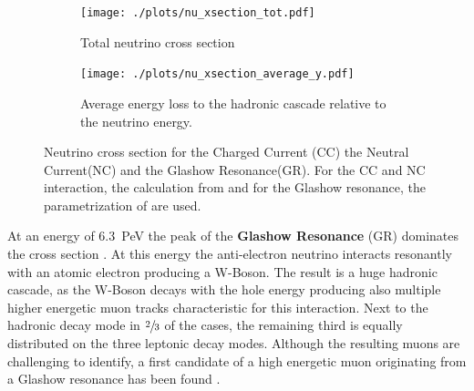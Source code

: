 \begin{figure}
    \centering
    \begin{subfigure}[t]{0.47\textwidth}
        \centering
        \texttt{[image: ./plots/nu\_xsection\_tot.pdf]}
        \caption{Total neutrino cross section}
        \label{fig:nu_xsection_tot}
    \end{subfigure}
    \hfill
    \begin{subfigure}[t]{0.47\textwidth}
        \centering
        \texttt{[image: ./plots/nu\_xsection\_average\_y.pdf]}
        \caption{Average energy loss to the hadronic cascade relative to the neutrino energy.}
        \label{fig:nu_xsection_y}
    \end{subfigure}
    \caption{Neutrino cross section for the Charged Current (CC) the Neutral Current(NC) and the Glashow Resonance(GR). For the CC and NC interaction, the calculation from \cite{CSMS11NuXsection} and for the Glashow resonance, the parametrization of \cite{Barger14} are used.}
    \label{fig:nu_xsection}
\end{figure}

At an energy of \SI{6.3}{PeV} the peak of the \textbf{Glashow Resonance} (GR) dominates the cross section \cite{Glashow60}.
At this energy the anti-electron neutrino interacts resonantly with an atomic electron producing a W-Boson.
The result is a huge hadronic cascade, as the W-Boson decays with the hole energy producing also multiple higher energetic muon tracks characteristic for this interaction.
Next to the hadronic decay mode in $\sfrac23$ of the cases, the remaining third is equally distributed on the three leptonic decay modes.
Although the resulting muons are challenging to identify, a first candidate of a high energetic muon originating from a Glashow resonance has been found \cite{IceCube2016Aachen}.


